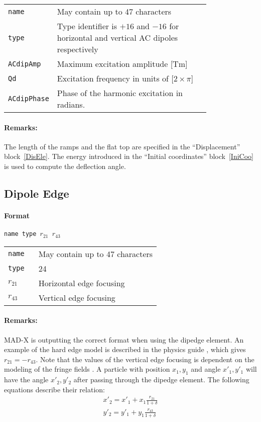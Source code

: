 \bigskip
\begin{tabular}{@{}lp{0.8\linewidth}}
    \texttt{name} & May contain up to 47 characters \\
    \texttt{type} & Type identifier is $+16$ and $-16$ for horizontal and vertical AC dipoles respectively \\
    \texttt{ACdipAmp} & Maximum excitation amplitude [Tm] \\
    \texttt{Qd}   & Excitation frequency in units of [$2 \times \pi$] \\
    \texttt{ACdipPhase} & Phase of the harmonic excitation in radians.
\end{tabular}

\paragraph{Remarks:}
The length of the ramps and the flat top are specified in the ``Displacement'' block~\ref{DisEle}. The energy introduced in the ``Initial coordinates'' block~\ref{IniCoo} is used to compute the deflection angle.

\subsection{Dipole Edge}

\paragraph{Format} \texttt{name type $r_{21}$ $r_{43}$}

\bigskip
\begin{tabular}{@{}lp{0.8\linewidth}}
    \texttt{name} & May contain up to 47 characters \\
    \texttt{type} & 24 \\
    \texttt{$r_{21}$} & Horizontal edge focusing \\
    \texttt{$r_{43}$} & Vertical edge focusing
\end{tabular}
    
\paragraph{Remarks:}
MAD-X is outputting the correct format when using the dipedge element. An example of  the hard edge model is described in the physics guide \cite{sixphys}, which gives $r_{21} = -r_{43}$.
Note that the values of the vertical edge focusing is dependent on the modeling of the fringe fields \cite{dipedge}.
A particle with position $x_{1},y_1$ and angle $x'_{1},y'_1$ will have the angle $x'_{2},y'_2$ after passing through the dipedge element.
The following equations describe their relation:
\begin{eqnarray}
    x'_{2} = x'_{1} + x_{1}\frac{r_{21}}{1+\delta} \\
    y'_{2} = y'_{1} + y_{1}\frac{r_{43}}{1+\delta}
\end{eqnarray}


